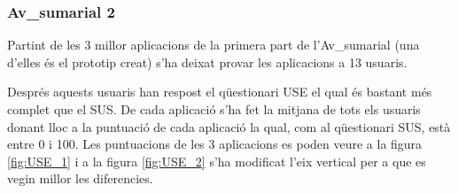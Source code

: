 \subsubsection{\Gls{Av_sumarial} 2}
Partint de les 3 millor aplicacions de la primera part de l'\gls{Av_sumarial} (una d'elles és el prototip creat) s'ha deixat provar les aplicacions a 13 usuaris. 

Després aquests usuaris han respost el qüestionari USE el qual és bastant més complet que el SUS. De cada aplicació s'ha fet la mitjana de tots els usuaris donant lloc a la puntuació de cada aplicació la qual, com al qüestionari SUS, està entre 0 i 100. Les puntuacions de les 3 aplicacions es poden veure a la figura \ref{fig:USE_1} i a la figura \ref{fig:USE_2} s'ha modificat l'eix vertical per a que es vegin millor les diferencies.


